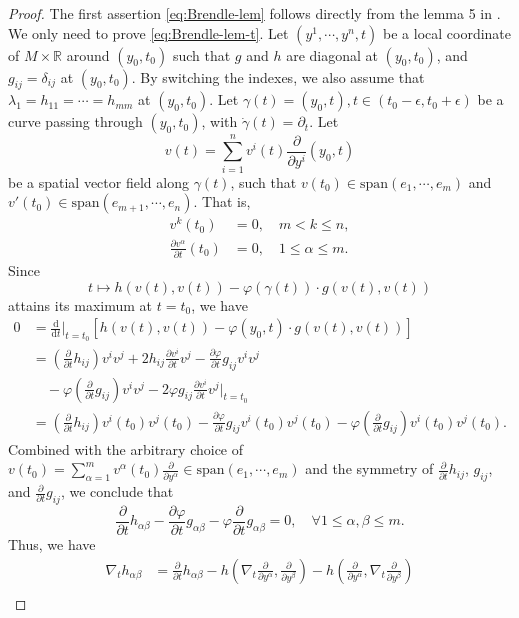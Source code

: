 \documentclass[10pt,a4paper]{amsart}
\newcommand{\dd}{\ensuremath{\text{d}}}
\newcommand{\R}{\ensuremath{\mathbb{R}}}
\newcommand{\pd}[2]{\frac{\partial {#1}}{\partial {#2}}}
\numberwithin{equation}{section}
\begin{document}
\begin{proof}
    The first assertion \eqref{eq:Brendle-lem} follows directly from the lemma 5 in \cite{Brendle2017}. We only need to prove \eqref{eq:Brendle-lem-t}. Let \((y^1,\cdots,y^n,t)\) be a local coordinate of \(M\times \R\) around \((y_0,t_0)\) such that \(g\) and \(h\) are diagonal at \((y_0,t_0)\), and \(g_{ij}=\delta_{ij}\) at \((y_0,t_0)\). By switching the indexes, we also assume that \(\lambda_1 = h_{11} = \cdots = h_{mm}\) at $(y_0,t_0)$. Let \(\gamma(t) = (y_0,t), t\in (t_0-\epsilon,t_0 + \epsilon)\) be a curve passing through \((y_0,t_0)\), with \(\dot{\gamma}(t) = \partial_t\). Let \[ v(t) = \sum_{i=1}^{n}v^i(t)\pd{}{y^i}(y_0,t)\] be a spatial vector field along \(\gamma(t)\), such that \(v(t_0) \in \text{span}(e_1,\cdots,e_m)\) and \(v'(t_0) \in \text{span}(e_{m+1},\cdots,e_n)\). That is, 
    \[ \begin{aligned}
        v^k(t_0) &= 0, \quad m < k \leq n, \\
        \pd{v^\alpha}{t}(t_0) &= 0, \quad 1\leq \alpha \leq m.
    \end{aligned} \]
    Since 
    \[ t\mapsto h(v(t),v(t)) - \varphi(\gamma(t))\cdot g(v(t),v(t)) \]
    attains its maximum at \(t = t_0\), we have 
    \[ \begin{aligned}
    0 &= \frac{\dd}{\dd t}\bigg|_{t=t_0}\left[h(v(t),v(t)) - \varphi(y_0,t)\cdot g(v(t),v(t))\right] \\
    &= \left(\pd{}{t}h_{ij}\right)v^i v^j + 2h_{ij}\pd{v^i}{t}v^j - \pd{\varphi}{t}g_{ij}v^i v^j \\
    &\quad -\varphi\left(\pd{}{t}g_{ij}\right)v^i v^j - 2\varphi g_{ij}\pd{v^i}{t} v^j \bigg|_{t=t_0}\\
    &= \left(\pd{}{t}h_{ij}\right)v^i(t_0) v^j(t_0) - \pd{\varphi}{t}g_{ij}v^i(t_0) v^j(t_0) -\varphi\left(\pd{}{t}g_{ij}\right)v^i(t_0) v^j(t_0).
    \end{aligned}
    \]
    Combined with the arbitrary choice of \(v(t_0) = \sum_{\alpha=1}^{m}v^\alpha(t_0) \pd{}{y^\alpha} \in \text{span}(e_1,\cdots,e_m)\) and the symmetry of \(\pd{}{t}h_{ij}\), \(g_{ij}\), and \(\pd{}{t}g_{ij}\), we conclude that 
    \[  \pd{}{t}h_{\alpha\beta} - \pd{\varphi}{t}g_{\alpha\beta} - \varphi \pd{}{t}g_{\alpha\beta} = 0,\quad \forall 1\leq \alpha,\beta \leq m.  \] 
  Thus, we have 
    \[ \begin{aligned}
        \nabla_t h_{\alpha\beta} &= \pd{}{t} h_{\alpha\beta} - h\left(\nabla_t \pd{}{y^\alpha}, \pd{}{y^\beta}\right) - h\left(\pd{}{y^\alpha}, \nabla_t\pd{}{y^\beta}\right)\\

\end{aligned}\]
\end{proof}
\end{document}
